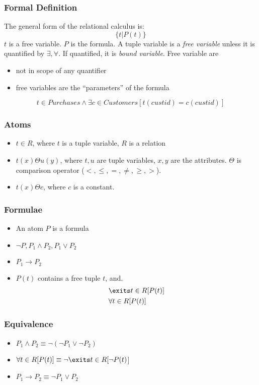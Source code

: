 \documentclass{beamer}
\begin{document}
\begin{frame}
  \frametitle{Formal Definition}
  The general form of the relational calculus is:
  $$
  \{t | P(t)\}
  $$
  $t$ is a free variable. $P$ is the formula. A tuple variable is a \textit{free
variable} unless it is quantified by $\exists, \forall$. If quantified, it is \textit{bound
variable}. Free variable are 
\begin{itemize}
\item not in scope of any quantifier
\item free variables are the “parameters” of the formula
\end{itemize}
  $$
  t \in Purchases \wedge \exists c \in Customers [t(custid)=c(custid)]
  $$
\end{frame}

\begin{frame}
  \frametitle{Atoms}
  \begin{itemize}
  \item $t \in R$, where $t$ is a tuple variable, $R$ is a relation
  \item $t(x) \Theta u(y)$, where $t, u$ are tuple variables, $x, y$ are the attributes. $\Theta$ is comparison operator ($<, \leq, =, \neq, \geq, >$).
  \item $t(x) \Theta c$, where $c$ is a constant. 
  \end{itemize}
\end{frame}

\begin{frame}
  \frametitle{Formulae}
  \begin{itemize}
  \item An atom $P$ is a formula 
  \item $\neg P, P_1 \wedge P_2, P_1 \vee P_2$
  \item $P_1 \rightarrow P_2$
  \item $P(t)$ contains a free tuple $t$, and.
  \begin{align*}
  &\exits t \in R [P(t)]\\
  &\forall t \in R [P(t)]
  \end{align*}
  \end{itemize}
\end{frame}


\begin{frame}
  \frametitle{Equivalence}
  \begin{itemize}
  \item $P_1 \wedge P_2 \equiv \neg (\neg P_1 \vee \neg P_2)$
  \item $\forall t \in R[P(t)] \equiv \neg \exits t \in R [\neg P(t)$]
  \item $P_1 \rightarrow P_2 \equiv \neg P_1 \vee P_2$
  \end{itemize}
\end{frame}
\end{document}
